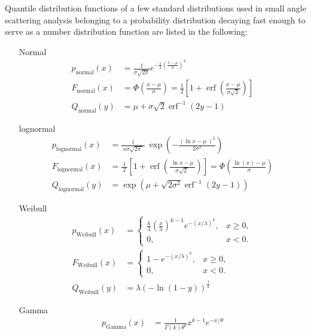 Quantile distribution functions of a few standard distributions used in small angle scattering analysis belonging to a probability distribution decaying fast enough to serve as a number distribution function are listed in the following:
\begin{itemize}
\item[Normal]
\begin{align}
p_\mathrm{normal}(x) &= {\frac {1}{\sigma {\sqrt {2\pi }}}}e^{-{\frac {1}{2}}\left({\frac {x-\mu }{\sigma }}\right)^{2}} \\
F_\mathrm{normal}(x) &= \Phi \left({\frac {x-\mu }{\sigma }}\right)={\frac {1}{2}}\left[1+\operatorname {erf} \left({\frac {x-\mu }{\sigma {\sqrt {2}}}}\right)\right]\\
Q_\mathrm{normal}(y) &=   \mu +\sigma {\sqrt {2}}\operatorname {erf} ^{-1}(2y-1)
\end{align}
\item[lognormal]
\begin{align}
p_\mathrm{lognormal}(x) &= {\frac {1}{\ x\sigma {\sqrt {2\pi \ }}\ }}\ \exp \left(-{\frac {\left(\ln x-\mu \ \right)^{2}}{2\sigma ^{2}}}\right) \\
F_\mathrm{lognormal}(x) &=  {\frac {\ 1\ }{2}}\left[1+\operatorname {erf} \left({\frac {\ \ln x-\mu \ }{\sigma {\sqrt {2\ }}}}\right)\right]=\Phi \left({\frac {\ln(x)-\mu }{\sigma }}\right)\\
Q_\mathrm{lognormal}(y) &=  \exp \left(\mu +{\sqrt {2\sigma ^{2}}}\operatorname {erf} ^{-1}(2y-1)\right)\
\end{align}
\item[Weibull]
\begin{align}
p_\mathrm{Weibull}(x)&={\begin{cases}{\frac {k}{\lambda }}\left({\frac {x}{\lambda }}\right)^{k-1}e^{-(x/\lambda )^{k}},&x\geq 0,\\0,&x<0.\end{cases}} \\
F_\mathrm{Weibull}(x)&={\begin{cases}1-e^{-(x/\lambda )^{k}},&x\geq 0,\\0,&x<0.\end{cases}} \\
Q_\mathrm{Weibull}(y)&=\lambda (-\ln(1-y))^{\frac {1}{k}}
\end{align}
\item[Gamma]
\begin{align}
p_\mathrm{Gamma}(x)&={\frac {1}{\Gamma (k)\theta ^{k}}}x^{k-1}e^{-x/\theta } \\

\end{align}
\end{itemize}
